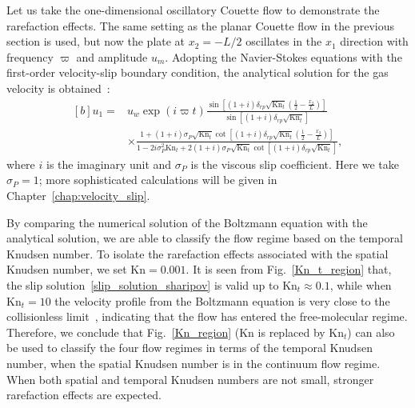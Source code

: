 Let us take the one-dimensional oscillatory Couette flow to demonstrate the rarefaction effects. The same setting as the planar Couette flow in the previous section is used, but now the plate at $x_2=-L/2$ oscillates in the $x_1$ direction with frequency $\varpi$ and amplitude $u_m$. Adopting the Navier-Stokes equations with the first-order velocity-slip boundary condition, the analytical solution for the gas velocity is obtained~\cite{Sharipov2008Couette}:
\begin{equation}\label{slip_solution_sharipov}
\begin{aligned}[b]
u_1=&u_w\exp(i\varpi{t})\frac{\sin\left[ (1+i)\delta_{rp}\sqrt{\text{Kn}_t}\left(\frac{1}{2}-\frac{x_2}{L}\right) \right]}{\sin\left[ (1+i)\delta_{rp}\sqrt{\text{Kn}_t} \right]}\\
&\times
\frac{1+(1+i)\sigma_P\sqrt{\text{Kn}_t}\cot\left[ (1+i)\delta_{rp}\sqrt{\text{Kn}_t} \left(\frac{1}{2}-\frac{x_2}{L}\right)\right]}
{1-2i\sigma_P^2{\text{Kn}_t}+2(1+i)\sigma_P\sqrt{\text{Kn}_t}\cot\left[ (1+i)\delta_{rp}\sqrt{\text{Kn}_t} \right]},
\end{aligned}
\end{equation}
where $i$ is the imaginary unit and $\sigma_P$ is the viscous slip coefficient. 
Here we take $\sigma_P=1$; more sophisticated calculations will be given in Chapter~\ref{chap:velocity_slip}. 



By comparing the numerical solution of the Boltzmann equation with the analytical solution, we are able to classify the flow regime based on the temporal Knudsen number. To isolate the rarefaction effects associated with the spatial Knudsen number, we set $\text{Kn}=0.001$. It is seen from Fig.~\ref{Kn_t_region} that, the slip solution~\eqref{slip_solution_sharipov} is valid up to $\text{Kn}_t\approx0.1$, while when $\text{Kn}_t=10$ the velocity profile from the Boltzmann equation is very close to the collisionless limit~\cite{Sharipov2008Couette}, indicating that the flow has entered the free-molecular regime. Therefore, we conclude that Fig.~\ref{Kn_region} ($\text{Kn}$ is replaced by $\text{Kn}_t$) can also be used to classify the four flow regimes in terms of the temporal Knudsen number, when the spatial Knudsen number is in the continuum flow regime. When both spatial and temporal Knudsen numbers are not small, stronger rarefaction effects are expected. 


